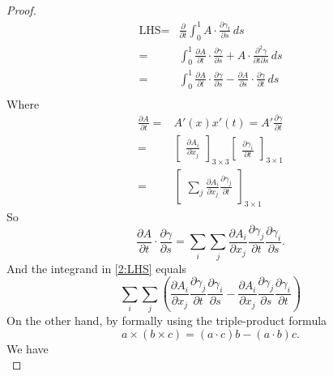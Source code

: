 \documentclass[12pt]{article}
\begin{document}
\begin{proof}
  \begin{equation}\label{2:LHS}
    \begin{aligned}
      \text{LHS} =& \frac{\partial}{\partial t}\int_0^1 A\cdot \frac{\partial\gamma_t}{\partial s}\,ds \\
      =& \int_0^1 \frac{\partial A}{\partial t}\cdot\frac{\partial \gamma}{\partial s}+A\cdot \frac{\partial^2 \gamma}{\partial t\partial s}\,ds \\
      =& \int_0^1 \frac{\partial A}{\partial t}\cdot\frac{\partial \gamma}{\partial s}-\frac{\partial A}{\partial s}\cdot\frac{\partial \gamma}{\partial t}\,ds \\
    \end{aligned}
  \end{equation}
  Where
  \begin{equation*}
    \begin{aligned}
      \frac{\partial A}{\partial t}=& A'(x)x'(t)=A'\frac{\partial \gamma}{\partial t} \\
      =& \begin{bmatrix}\displaystyle \frac{\partial A_i}{\partial x_j} \end{bmatrix}_{3\times3}\begin{bmatrix}\displaystyle \frac{\partial \gamma_i}{\partial t} \end{bmatrix}_{3\times1} \\
      =& \begin{bmatrix}\displaystyle \sum_j \frac{\partial A_i}{\partial x_j} \frac{\partial \gamma_j}{\partial t} \end{bmatrix}_{3\times1}
    \end{aligned}
  \end{equation*}
  So
  \[
    \frac{\partial A}{\partial t} \cdot \frac{\partial \gamma}{\partial s}
    =\sum_i\sum_j \frac{\partial A_i}{\partial x_j} \frac{\partial \gamma_j}{\partial t} \frac{\partial \gamma_i}{\partial s}
  .\]
  And the integrand in \cref{2:LHS} equals
  \begin{equation}
    \sum_i\sum_j(\frac{\partial A_i}{\partial x_j} \frac{\partial \gamma_j}{\partial t} \frac{\partial \gamma_i}{\partial s}-\frac{\partial A_i}{\partial x_j} \frac{\partial \gamma_j}{\partial s} \frac{\partial \gamma_i}{\partial t})\label{intd}
  \end{equation}
  On the other hand, by formally using the triple-product formula
  \[
    a\times (b\times c)=(a\cdot c)b-(a\cdot b)c
  .\]
  We have
  \begin{equation}

\end{equation}
\end{proof}
\end{document}

